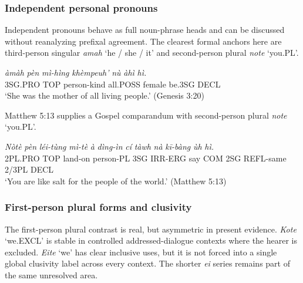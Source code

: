 \documentclass[
  11pt,
  a4paper,
]{article}
\newcommand{\tdim}[1]{\textit{#1}}
\newcommand{\tdimword}[1]{\textit{#1}}
\renewcommand{\textsc}[1]{{\footnotesize\MakeUppercase{#1}}}
\newcommand{\glossquote}[1]{`#1'}
\begin{document}
\subsubsection{Independent personal
pronouns}\label{independent-personal-pronouns}

Independent pronouns behave as full noun-phrase heads and can be
discussed without reanalyzing prefixal agreement. The clearest formal
anchors here are third-person singular \tdim{amah}
\glossquote{he / she / it} and second-person plural \tdim{note}
\glossquote{you.PL}.

\begin{exe}
\ex \label{ex:pro-amah}
\gll \tdimword{àmàh} \tdimword{pèn} \tdimword{mì-hìng} \tdimword{khèmpeuh'} \tdimword{nù} \tdimword{àhì} \tdimword{hì.} \\
     \textsc{3sg}.\textsc{pro} \textsc{top} person-kind all.\textsc{poss} female be.\textsc{3sg} \textsc{decl} \\
\glt \glossquote{She was the mother of all living people.} (Genesis 3:20)
\end{exe}

Matthew 5:13 supplies a Gospel comparandum with second-person plural
\tdim{note} \glossquote{you.PL}.

\begin{exe}
\ex \label{ex:pro-note}
\gll \tdimword{Nòtè} \tdimword{pèn} \tdimword{léi-tùng} \tdimword{mì-tè} \tdimword{à} \tdimword{dìng-ìn} \tdimword{cí} \tdimword{tàwh} \tdimword{nà} \tdimword{kī-bàng} \tdimword{ùh} \tdimword{hì.} \\
     \textsc{2pl}.\textsc{pro} \textsc{top} land-on person-\textsc{pl} \textsc{3sg} \textsc{irr}-\textsc{erg} say \textsc{com} \textsc{2sg} \textsc{refl}-same 2/3PL \textsc{decl} \\
\glt \glossquote{You are like salt for the people of the world.} (Matthew 5:13)
\end{exe}

\subsubsection{First-person plural forms and
clusivity}\label{first-person-plural-forms-and-clusivity}

The first-person plural contrast is real, but asymmetric in present
evidence. \tdim{Kote} \glossquote{we.EXCL} is stable in controlled
addressed-dialogue contexts where the hearer is excluded. \tdim{Eite}
\glossquote{we} has clear inclusive uses, but it is not forced into a
single global clusivity label across every context. The shorter
\tdim{ei} series remains part of the same unresolved area.
\end{document}

